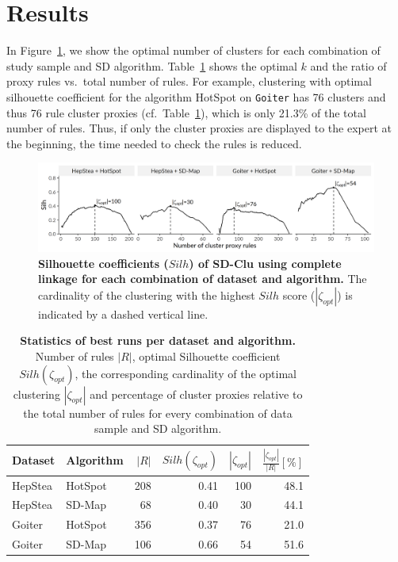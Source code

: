 \documentclass[
  oneside]{book}
\begin{document}
\hypertarget{sdclu-results}{%
\section{Results}\label{sdclu-results}}

In Figure~\ref{fig:04-silh-comparison}, we show the optimal number of clusters for each combination of study sample and SD algorithm.
Table~\ref{tab:04-silh} shows the optimal \(k\) and the ratio of proxy rules vs.~total number of rules.
For example, clustering with optimal silhouette coefficient for the algorithm HotSpot on \texttt{Goiter} has 76 clusters and thus 76 rule cluster proxies (cf.~Table~\ref{tab:04-silh}), which is only 21.3\% of the total number of rules.
Thus, if only the cluster proxies are displayed to the expert at the beginning, the time needed to check the rules is reduced.



\begin{figure}[h]

{\centering \includegraphics[width=1\linewidth]{figures/04-silh-comparison} 

}

\caption{\textbf{Silhouette coefficients (\(Silh\)) of SD-Clu using complete linkage for each combination of dataset and algorithm.} The cardinality of the clustering with the highest \(Silh\) score (\(|\zeta_{opt}|\)) is indicated by a dashed vertical line.}\label{fig:04-silh-comparison}
\end{figure}



\begin{table}

\caption{\label{tab:04-silh}\textbf{Statistics of best runs per dataset and algorithm.} Number of rules \(|R|\), optimal Silhouette coefficient \(Silh(\zeta_{opt})\), the corresponding cardinality of the optimal clustering \(|\zeta_{opt}|\) and percentage of cluster proxies relative to the total number of rules for every combination of data sample and SD algorithm.}
\centering
\begin{tabular}[t]{llrrrr}
\toprule
Dataset & Algorithm & $|R|$ & $Silh(\zeta_{opt})$ & $|\zeta_{opt}|$ & $\frac{|\zeta_{opt}|}{|R|} [\%]$\\
\midrule
HepStea & HotSpot & 208 & 0.41 & 100 & 48.1\\
HepStea & SD-Map & 68 & 0.40 & 30 & 44.1\\
Goiter & HotSpot & 356 & 0.37 & 76 & 21.0\\
Goiter & SD-Map & 106 & 0.66 & 54 & 51.6\\
\bottomrule
\end{tabular}
\end{table}
\end{document}
